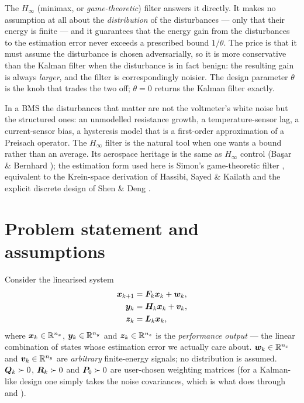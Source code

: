The $H_\infty$ (minimax, or \emph{game-theoretic}) filter answers it directly.  It makes no
assumption at all about the \emph{distribution} of the disturbances --- only that their energy is
finite --- and it guarantees that the energy gain from the disturbances to the estimation error
never exceeds a prescribed bound $1/\theta$.  The price is that it must assume the disturbance is
chosen adversarially, so it is more conservative than the Kalman filter when the disturbance is in
fact benign: the resulting gain is always \emph{larger}, and the filter is correspondingly noisier.
The design parameter $\theta$ is the knob that trades the two off; $\theta=0$ returns the Kalman
filter exactly.

In a BMS the disturbances that matter are not the voltmeter's white noise but the structured ones:
an unmodelled resistance growth, a temperature-sensor lag, a current-sensor bias, a hysteresis
model that is a first-order approximation of a Preisach operator.  The $H_\infty$ filter is the
natural tool when one wants a bound rather than an average.  Its aerospace heritage is the same as
$H_\infty$ control (Ba\c{s}ar \& Bernhard \cite{basar1995dynamicgames}); the estimation form used
here is Simon's game-theoretic filter \cite[Ch.~11]{simon2006}, equivalent to the Krein-space
derivation of Hassibi, Sayed \& Kailath \cite{hassibi1996hinf} and the explicit discrete design of
Shen \& Deng \cite{shen1997hinf}.

\section{Problem statement and assumptions}
Consider the linearised system
\begin{align}
\bm{x}_{k+1} &= \bm{F}_k\bm{x}_k + \bm{w}_k, \label{eq:hi-f}\\
\bm{y}_k &= \bm{H}_k\bm{x}_k + \bm{v}_k, \label{eq:hi-h}\\
\bm{z}_k &= \bm{L}_k\bm{x}_k, \label{eq:hi-z}
\end{align}
where $\bm{x}_k\in\mathbb{R}^{n_x}$, $\bm{y}_k\in\mathbb{R}^{n_y}$ and $\bm{z}_k\in\mathbb{R}^{n_z}$ is the
\emph{performance output} --- the linear combination of states whose estimation error we actually
care about.  $\bm{w}_k\in\mathbb{R}^{n_x}$ and $\bm{v}_k\in\mathbb{R}^{n_y}$ are \emph{arbitrary} finite-energy
signals; no distribution is assumed.  $\bm{Q}_k\succ0$, $\bm{R}_k\succ0$ and $\bm{P}_0\succ0$ are
user-chosen weighting matrices (for a Kalman-like design one simply takes the noise covariances,
which is what  does through  and ).

